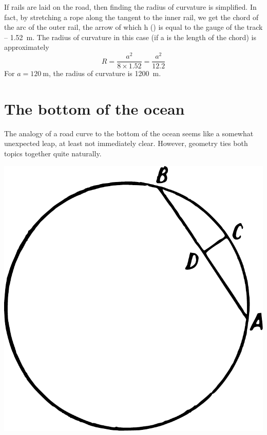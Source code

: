 If rails are laid on the road, then finding the radius of curvature is simplified. In fact, by stretching a rope along the tangent to the inner rail, we get the chord of the arc of the outer rail, the arrow of which h () is equal to the gauge of the track -- \SI{1.52}{\meter}. The radius of curvature in this case (if a is the length of the chord) is approximately
\begin{equation*}%
R = \frac{a^{2}}{8 \times 1.52} = \frac{a^{2}}{12.2}
\end{equation*}
For $a = \SI{120}{\meter}$, the radius of curvature is \SI{1200}{\meter}.




\section{The bottom of the ocean}
\label{sec-4.8}

The analogy of a road curve to the bottom of the ocean seems like a somewhat unexpected leap, at least not immediately clear. However, geometry ties both topics together quite naturally.

\begin{marginfigure}%
\centering
\includegraphics[width=\textwidth]{figures/ch-04/fig-086.pdf}
\end{marginfigure}


